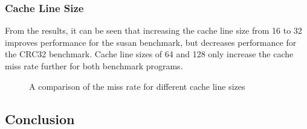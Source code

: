 \subsubsection{Cache Line Size}

From the results, it can be seen that increasing the cache line size from 16 to 32 
improves performance for the susan benchmark, but decreases performance for the CRC32 
benchmark. Cache line sizes of 64 and 128 only increase the cache miss rate further for 
both benchmark programs.

\begin{figure}[H]
    \centering
    
    \caption{A comparison of the miss rate for different cache line sizes}
    \label{fig:partb-cacheln}
\end{figure}


\subsection{Conclusion}
